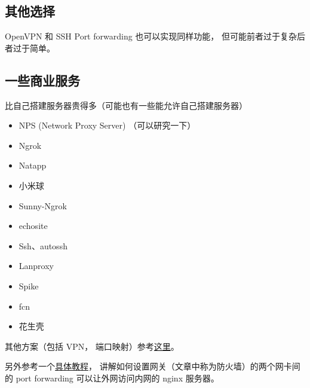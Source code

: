 \subsection{其他选择}
OpenVPN 和 SSH Port forwarding 也可以实现同样功能， 但可能前者过于复杂后者过于简单。

\subsection{一些商业服务}
比自己搭建服务器贵得多（可能也有一些能允许自己搭建服务器）
\begin{itemize}
\item NPS (Network Proxy Server) （可以研究一下）
\item Ngrok
\item Natapp
\item 小米球
\item Sunny-Ngrok
\item echosite
\item Ssh、autossh
\item Lanproxy
\item Spike
\item fcn
\item 花生壳
\end{itemize}

其他方案（包括 VPN， 端口映射）参考\href{https://johackim.com/how-to-expose-local-server-behind-firewall}{这里}。

另外参考一个\href{https://www.digitalocean.com/community/tutorials/how-to-forward-ports-through-a-linux-gateway-with-iptables}{具体教程}， 讲解如何设置网关（文章中称为防火墙）的两个网卡间的 port forwarding 可以让外网访问内网的 nginx 服务器。 
